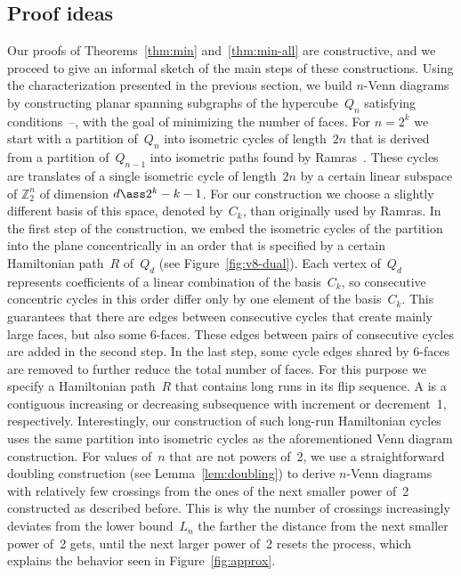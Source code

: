\subsection{Proof ideas}
\label{sec:ideas}
%
Our proofs of Theorems~\ref{thm:min} and~\ref{thm:min-all} are constructive, and we proceed to give an informal sketch of the main steps of these constructions.
%
Using the characterization presented in the previous section, we build $n$-Venn diagrams by constructing planar spanning subgraphs of the hypercube~$Q_n$ satisfying conditions~--, with the goal of minimizing the number of faces.
%
For $n=2^k$ we start with a partition of~$Q_n$ into isometric cycles of length~$2n$ that is derived from a partition of~$Q_{n-1}$ into isometric paths found by Ramras~\cite{MR1152451}.
These cycles are translates of a single isometric cycle of length~$2n$ by a certain linear subspace of $\mathbb{Z}_2^n$ of dimension $d\ass 2^k-k-1$.
For our construction we choose a slightly different basis of this space, denoted by~$C_k$, than originally used by Ramras.
%
In the first step of the construction, we embed the isometric cycles of the partition into the plane concentrically in an order that is specified by a  certain Hamiltonian path~$R$ of~$Q_d$ (see Figure~\ref{fig:v8-dual}).
Each vertex of~$Q_d$ represents coefficients of a linear combination of the basis~$C_k$, so consecutive concentric cycles in this order differ only by one element of the basis~$C_k$.
This guarantees that there are edges between consecutive cycles that create mainly large faces, but also some 6-faces.
These edges between pairs of consecutive cycles are added in the second step.
%
In the last step, some cycle edges shared by 6-faces are removed to further reduce the total number of faces.
For this purpose we specify a Hamiltonian path~$R$ that contains long runs in its flip sequence.
A  is a contiguous increasing or decreasing subsequence with increment or decrement~1, respectively.
Interestingly, our construction of such long-run Hamiltonian cycles uses the same partition into isometric cycles as the aforementioned Venn diagram construction.
%
For values of~$n$ that are not powers of~2, we use a straightforward doubling construction (see Lemma~\ref{lem:doubling}) to derive $n$-Venn diagrams with relatively few crossings from the ones of the next smaller power of~2 constructed as described before.
This is why the number of crossings increasingly deviates from the lower bound~$L_n$ the farther the distance from the next smaller power of~2 gets, until the next larger power of~2 resets the process, which explains the behavior seen in Figure~\ref{fig:approx}.
%
%
